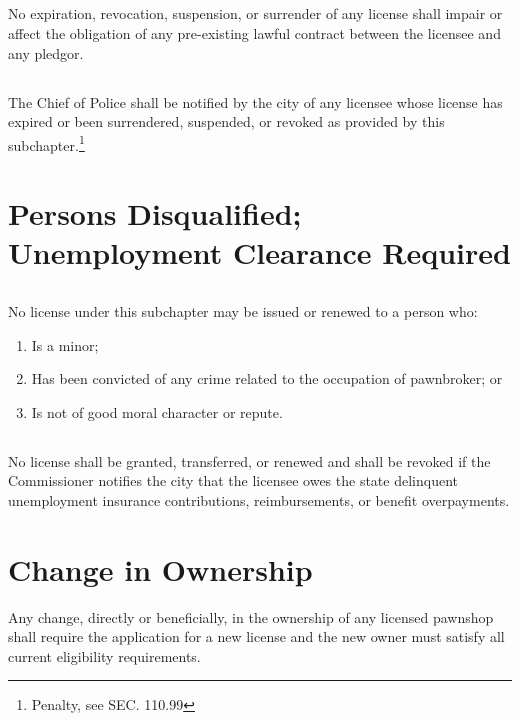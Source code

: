 \subsection{}
No expiration, revocation, suspension, or surrender of any license shall impair or affect the obligation of any pre-existing lawful contract between the licensee and any pledgor.
\subsection{}
The Chief of Police shall be notified by the city of any licensee whose license has expired or been surrendered, suspended, or revoked as provided by this subchapter.\footnote{Penalty, see SEC. 110.99}

\section{Persons Disqualified; Unemployment Clearance Required}
\subsection{}
No license under this subchapter may be issued or renewed to a person who:
\begin{enumerate}[{\indent}1)]
    \item Is a minor; 
    \item Has been convicted of any crime related to the occupation of pawnbroker; or 
    \item Is not of good moral character or repute.
\end{enumerate}
\subsection{}
No license shall be granted, transferred, or renewed and shall be revoked if the Commissioner notifies the city that the licensee owes the state delinquent unemployment insurance contributions, reimbursements, or benefit overpayments.

\section{Change in Ownership}
Any change, directly or beneficially, in the ownership of any licensed pawnshop shall require the application for a new license and the new owner must satisfy all current eligibility requirements.

